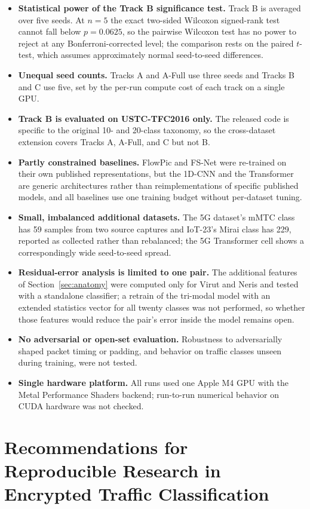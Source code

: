 \documentclass[journal]{IEEEtran}
\begin{document}
\begin{itemize}
\item \textbf{Statistical power of the Track B significance test.} Track B is averaged over five seeds. At $n=5$ the exact two-sided Wilcoxon signed-rank test cannot fall below $p=0.0625$, so the pairwise Wilcoxon test has no power to reject at any Bonferroni-corrected level; the comparison rests on the paired $t$-test, which assumes approximately normal seed-to-seed differences.
\item \textbf{Unequal seed counts.} Tracks A and A-Full use three seeds and Tracks B and C use five, set by the per-run compute cost of each track on a single GPU.
\item \textbf{Track B is evaluated on USTC-TFC2016 only.} The released code is specific to the original 10- and 20-class taxonomy, so the cross-dataset extension covers Tracks A, A-Full, and C but not B.
\item \textbf{Partly constrained baselines.} FlowPic and FS-Net were re-trained on their own published representations, but the 1D-CNN and the Transformer are generic architectures rather than reimplementations of specific published models, and all baselines use one training budget without per-dataset tuning.
\item \textbf{Small, imbalanced additional datasets.} The 5G dataset's mMTC class has 59 samples from two source captures and IoT-23's Mirai class has 229, reported as collected rather than rebalanced; the 5G Transformer cell shows a correspondingly wide seed-to-seed spread.
\item \textbf{Residual-error analysis is limited to one pair.} The additional features of Section~\ref{sec:anatomy} were computed only for Virut and Neris and tested with a standalone classifier; a retrain of the tri-modal model with an extended statistics vector for all twenty classes was not performed, so whether those features would reduce the pair's error inside the model remains open.
\item \textbf{No adversarial or open-set evaluation.} Robustness to adversarially shaped packet timing or padding, and behavior on traffic classes unseen during training, were not tested.
\item \textbf{Single hardware platform.} All runs used one Apple M4 GPU with the Metal Performance Shaders backend; run-to-run numerical behavior on CUDA hardware was not checked.
\end{itemize}

\section{Recommendations for Reproducible Research in Encrypted Traffic Classification}\label{sec:recs}
\end{document}
